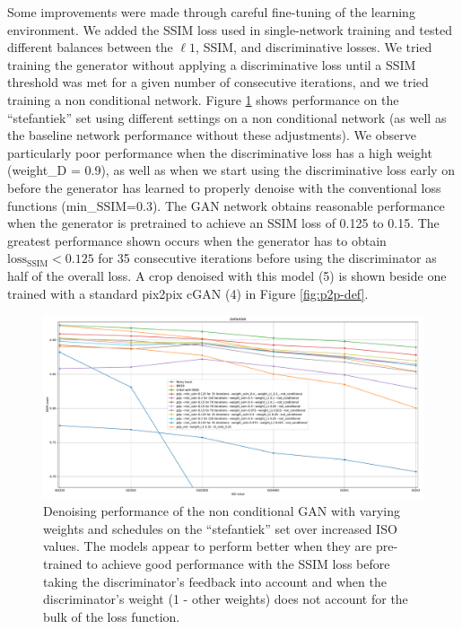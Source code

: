 Some improvements were made through careful fine-tuning of the learning environment. We added the \ac{SSIM} loss used in single-network training and tested different balances between the $\ell 1$, \ac{SSIM}, and discriminative losses. We tried training the generator without applying a discriminative loss until a SSIM threshold was met for a given number of consecutive iterations, and we tried training a non conditional network. Figure \ref{fig:p2p-comp-1} shows performance on the ``stefantiek'' set using different settings on a non conditional network (as well as the baseline network performance without these adjustments). We observe particularly poor performance when the discriminative loss has a high weight (weight\_D = 0.9), as well as when we start using the discriminative loss early on before the generator has learned to properly denoise with the conventional loss functions (min\_SSIM=0.3). The GAN network obtains reasonable performance when the generator is pretrained to achieve an \ac{SSIM} loss of 0.125 to 0.15. The greatest performance shown occurs when the generator has to obtain $\text{loss}_\text{SSIM} < 0.125$ for 35 consecutive iterations before using the discriminator as half of the overall loss. A crop denoised with this model (5) is shown beside one trained with a standard pix2pix \ac{cGAN} (4) in Figure \ref{fig:p2p-def}.

\begin{figure}[!htbp]
\centering
\includegraphics[width=1\linewidth]{gfx/graphs/p2p-comp-1.pdf}
\caption[Denoising performance of \acsp{GAN} on the ``stefantiek'' set]{Denoising performance of the non conditional GAN with varying weights and schedules on the ``stefantiek'' set over increased ISO values. The models appear to perform better when they are pre-trained to achieve good performance with the \acs{SSIM} loss before taking the discriminator's feedback into account and when the discriminator's weight (1 - other weights) does not account for the bulk of the loss function.}
\label{fig:p2p-comp-1}
\end{figure}

